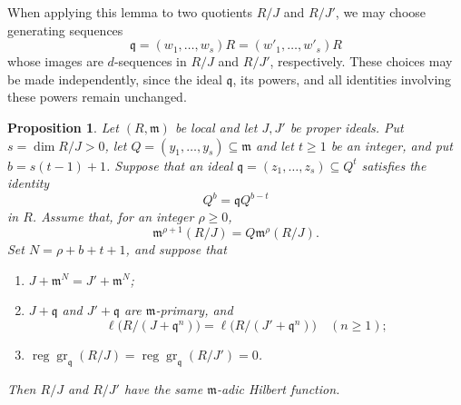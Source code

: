 \documentclass[11pt,reqno]{amsart}
\numberwithin{equation}{section}
\newtheorem{proposition}[theorem]{Proposition}
\theoremstyle{definition}
\begin{document}
When applying this lemma to two quotients $R/J$ and $R/J'$, we may
choose generating sequences
\[
 \mathfrak q=(w_1,\ldots,w_s)R=(w'_1,\ldots,w'_s)R
\]
whose images are $d$-sequences in $R/J$ and $R/J'$, respectively.
These choices may be made independently, since the ideal
$\mathfrak q$, its powers, and all identities involving these powers
remain unchanged.

\begin{proposition}\label{prop:tr-hilbert-comparison}
Let $(R,\mathfrak m)$ be local and let $J,J'$ be proper ideals.
Put $s=\dim R/J>0$, let
$Q=(y_1,\ldots,y_s)\subseteq\mathfrak m$ and let $t\geq1$ be an integer,
and put $b=s(t-1)+1$. Suppose that an ideal
$\mathfrak q=(z_1,\ldots,z_s)\subseteq Q^t$
satisfies the identity
\begin{equation}\label{eq:tr-balanced-identity}
 Q^b=\mathfrak qQ^{b-t}
\end{equation}
in $R$. Assume that, for an integer $\rho\geq0$,
\begin{equation}\label{eq:tr-original-reduction}
 \mathfrak m^{\rho+1}(R/J)=Q\mathfrak m^\rho(R/J).
\end{equation}
Set $N=\rho+b+t+1$, and suppose that
\begin{enumerate}
 \item $J+\mathfrak m^N=J'+\mathfrak m^N$;
 \item $J+\mathfrak q$ and $J'+\mathfrak q$ are
 $\mathfrak m$-primary, and
 \[
 \ell\bigl(R/(J+\mathfrak q^n)\bigr)
 =\ell\bigl(R/(J'+\mathfrak q^n)\bigr)\quad(n\geq1);
 \]
 \item $\operatorname{reg}\operatorname{gr}_{\mathfrak q}(R/J)
       =\operatorname{reg}\operatorname{gr}_{\mathfrak q}(R/J')=0$.
\end{enumerate}
Then $R/J$ and $R/J'$ have the same $\mathfrak m$-adic Hilbert function.
\end{proposition}
\end{document}
